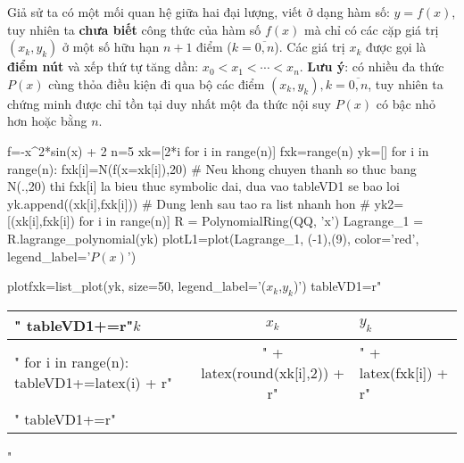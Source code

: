 \documentclass[12pt]{article}
\begin{document}

\sdd





\newpage{}


\newpage{}

Giả sử ta có một mối quan hệ giữa hai đại lượng, viết ở dạng hàm số: $y=f(x)$, tuy nhiên ta \textbf{chưa biết} công thức của hàm số $f(x)$ mà chỉ có các cặp giá trị $(x_k,y_k)$ ở một số hữu hạn $n+1$ điểm ($k=\overline{0,n}$). Các giá trị $x_k$ được gọi là \textbf{điểm nút} và xếp thứ tự tăng dần: $x_0 < x_1 < \cdots < x_n$.
\textbf{Lưu ý}: có nhiều đa thức $P(x)$ cùng thỏa điều kiện đi qua bộ các điểm $(x_k,y_k), k=\overline{0,n}$, tuy nhiên ta chứng minh được chỉ tồn tại duy nhất một đa thức nội suy $P(x)$ có bậc nhỏ hơn hoặc bằng $n$.

\newpage{}

\begin{sagesilent}
 f=-x^2*sin(x) + 2
 n=5
 xk=[2*i for i in range(n)]
 fxk=range(n)
 yk=[]
 for i in range(n):
   fxk[i]=N(f(x=xk[i]),20)
   # Neu khong chuyen thanh so thuc bang N(.,20) thi fxk[i] la bieu thuc symbolic dai, dua vao tableVD1 se bao loi
   yk.append((xk[i],fxk[i]))
 # Dung lenh sau tao ra list nhanh hon
 # yk2=[(xk[i],fxk[i]) for i in range(n)]
 R = PolynomialRing(QQ, 'x')
 Lagrange_1 = R.lagrange_polynomial(yk)
 plotL1=plot(Lagrange_1, (-1),(9), color='red', legend_label='$P(x)$')

 plotfxk=list_plot(yk, size=50, legend_label='($x_k$,$y_k$)')
 tableVD1=r"\begin{tabular}{l|c|l}"
 tableVD1+=r"$k$ & $x_k$ & $y_k$ \\ \hline"
 for i in range(n):
   tableVD1+=latex(i) + r"&" + latex(round(xk[i],2)) + r"&" + latex(fxk[i]) + r"\\"
 tableVD1+=r"\end{tabular}"
\end{sagesilent}
\end{document}
